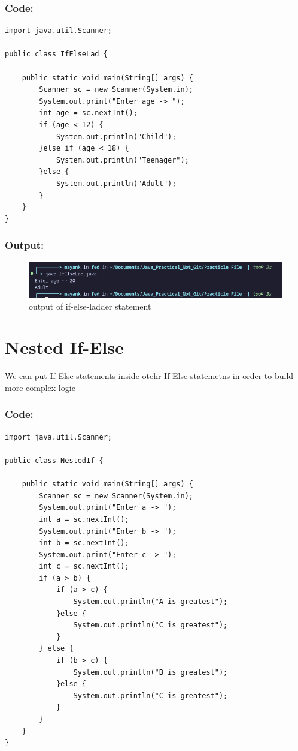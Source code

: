 \documentclass[a4paper,12pt]{article}
\begin{document}
\subsubsection{Code: }
\begin{lstlisting}
import java.util.Scanner;

public class IfElseLad {

    public static void main(String[] args) {
        Scanner sc = new Scanner(System.in);
        System.out.print("Enter age -> ");
        int age = sc.nextInt();
        if (age < 12) {
            System.out.println("Child"); 
        }else if (age < 18) {
            System.out.println("Teenager"); 
        }else {
            System.out.println("Adult");
        }
    }
}

    \end{lstlisting}
\subsubsection{Output: }
\begin{figure}[H]
    \centering
    \includegraphics[width=0.9\linewidth]{images/IfElseLad.png}
    \caption{output of if-else-ladder statement}
    \label{fig:sample_image}
\end{figure}

\section{Nested If-Else}
We can put If-Else statements inside otehr If-Else statemetns in order to build more
complex logic
\subsubsection{Code: }
\begin{lstlisting}
import java.util.Scanner;

public class NestedIf {

    public static void main(String[] args) {
        Scanner sc = new Scanner(System.in);
        System.out.print("Enter a -> ");
        int a = sc.nextInt();
        System.out.print("Enter b -> ");
        int b = sc.nextInt();
        System.out.print("Enter c -> ");
        int c = sc.nextInt();
        if (a > b) {
            if (a > c) {
                System.out.println("A is greatest"); 
            }else {
                System.out.println("C is greatest");
            }
        } else {
            if (b > c) {
                System.out.println("B is greatest"); 
            }else {
                System.out.println("C is greatest");
            }
        }
    }
}    
\end{lstlisting}
\end{document}
